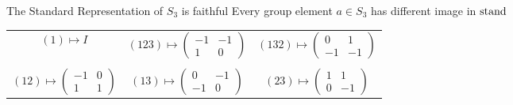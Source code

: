 \begin{frame}{The Standard Representation of $S_3$ is faithful}
    \large
    Every group element $a \in S_3$ has different image in $\operatorname{stand}$

    \pause
    \vspace{1em}
    \centering
    \begin{tabular}{c c c}
        $(1) \mapsto I$ & \pause $(123) \mapsto \begin{pmatrix}
            -1 & -1 \\
            1 & 0
        \end{pmatrix}$ & \pause $(132) \mapsto \begin{pmatrix}
            0 & 1 \\
            -1 & -1
        \end{pmatrix}$ \\\\ \pause $(12) \mapsto \begin{pmatrix}
            -1 & 0 \\
            1 & 1
        \end{pmatrix}$ & \pause $(13) \mapsto \begin{pmatrix}
            0 & -1 \\
            -1 & 0
        \end{pmatrix}$ & \pause $(23) \mapsto \begin{pmatrix}
            1 & 1 \\
            0 & -1
        \end{pmatrix}$
    \end{tabular}
\end{frame}

